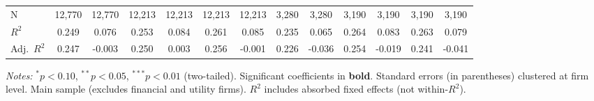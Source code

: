\begin{landscape}
\begin{table}[H]
\begin{tabular}{lcccccccccccc}
\midrule
N & 12,770 & 12,770 & 12,213 & 12,213 & 12,213 & 12,213 & 3,280 & 3,280 & 3,190 & 3,190 & 3,190 & 3,190 \\
$R^2$ & 0.249 & 0.076 & 0.253 & 0.084 & 0.261 & 0.085 & 0.235 & 0.065 & 0.264 & 0.083 & 0.263 & 0.079 \\
Adj.~$R^2$ & 0.247 & -0.003 & 0.250 & 0.003 & 0.256 & -0.001 & 0.226 & -0.036 & 0.254 & -0.019 & 0.241 & -0.041 \\
\bottomrule
\end{tabular}
\begin{minipage}{\linewidth}
\vspace{2pt}\scriptsize
\textit{Notes:} $^{*}p<0.10$, $^{**}p<0.05$, $^{***}p<0.01$ (two-tailed).
 Significant coefficients in \textbf{bold}.
 Standard errors (in parentheses) clustered at firm level.
 Main sample (excludes financial and utility firms).
 $R^2$ includes absorbed fixed effects (not within-$R^2$).
\end{minipage}
\end{table}
\end{landscape}
